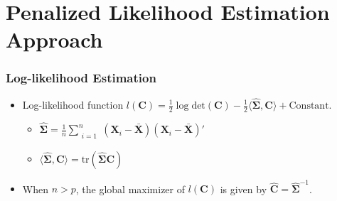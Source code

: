 \documentclass{beamer}
\newcommand{\boldSigma}{{\boldsymbol{\Sigma}}}
\begin{document}
\section{Penalized Likelihood Estimation Approach}


\begin{frame}
\frametitle{Log-likelihood Estimation}
\begin{itemize}
\item Log-likelihood function $l(\mathbf{C}) = \frac{1}{2} \log \text{det} (\mathbf{C}) - \frac{1}{2} \langle \hat{\boldSigma}, \mathbf{C} \rangle + \text{Constant}$.
    \begin{itemize} 
    \item $\hat{\boldSigma} = \frac{1}{n} \sum_{\substack{i = 1}}^n (\mathbf{X}_i - \bar{\mathbf{X}}) (\mathbf{X}_i - \bar{\mathbf{X}})' $ 
    \item $\langle \hat{\boldSigma}, \mathbf{C} \rangle = \text{tr}(\hat{\boldSigma} \mathbf{C} )$
    \end{itemize}
\item When $ n > p$, the global maximizer of $l(\mathbf{C})$ is given by $\hat{\mathbf{C}} = \hat{\boldSigma}^{-1}$.   
\end{itemize}

\end{frame}
\end{document}
